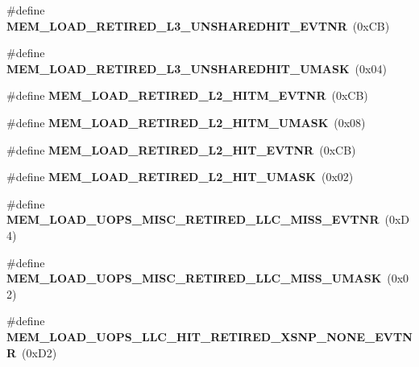 \begin{DoxyCompactItemize}
\item 
\#define {\bfseries M\+E\+M\+\_\+\+L\+O\+A\+D\+\_\+\+R\+E\+T\+I\+R\+E\+D\+\_\+\+L3\+\_\+\+U\+N\+S\+H\+A\+R\+E\+D\+H\+I\+T\+\_\+\+E\+V\+T\+N\+R}~(0x\+C\+B)\label{types_8h_ac3057c525d05ff1ff3bbc866a6959ef0}

\item 
\#define {\bfseries M\+E\+M\+\_\+\+L\+O\+A\+D\+\_\+\+R\+E\+T\+I\+R\+E\+D\+\_\+\+L3\+\_\+\+U\+N\+S\+H\+A\+R\+E\+D\+H\+I\+T\+\_\+\+U\+M\+A\+S\+K}~(0x04)\label{types_8h_a82af69ba17f2c14d73f672e6ab64392d}

\item 
\#define {\bfseries M\+E\+M\+\_\+\+L\+O\+A\+D\+\_\+\+R\+E\+T\+I\+R\+E\+D\+\_\+\+L2\+\_\+\+H\+I\+T\+M\+\_\+\+E\+V\+T\+N\+R}~(0x\+C\+B)\label{types_8h_a4fa3ebccc930b769a6fab108e11d98a1}

\item 
\#define {\bfseries M\+E\+M\+\_\+\+L\+O\+A\+D\+\_\+\+R\+E\+T\+I\+R\+E\+D\+\_\+\+L2\+\_\+\+H\+I\+T\+M\+\_\+\+U\+M\+A\+S\+K}~(0x08)\label{types_8h_a425b82db02859d2176d1626972950617}

\item 
\#define {\bfseries M\+E\+M\+\_\+\+L\+O\+A\+D\+\_\+\+R\+E\+T\+I\+R\+E\+D\+\_\+\+L2\+\_\+\+H\+I\+T\+\_\+\+E\+V\+T\+N\+R}~(0x\+C\+B)\label{types_8h_ab0383f3dadd106b0e563ad7459a4fc78}

\item 
\#define {\bfseries M\+E\+M\+\_\+\+L\+O\+A\+D\+\_\+\+R\+E\+T\+I\+R\+E\+D\+\_\+\+L2\+\_\+\+H\+I\+T\+\_\+\+U\+M\+A\+S\+K}~(0x02)\label{types_8h_a74427facc02a83299c443b9b6e424cc1}

\item 
\#define {\bfseries M\+E\+M\+\_\+\+L\+O\+A\+D\+\_\+\+U\+O\+P\+S\+\_\+\+M\+I\+S\+C\+\_\+\+R\+E\+T\+I\+R\+E\+D\+\_\+\+L\+L\+C\+\_\+\+M\+I\+S\+S\+\_\+\+E\+V\+T\+N\+R}~(0x\+D4)\label{types_8h_ab964a48398e98cbc7d1a7d08937a5c06}

\item 
\#define {\bfseries M\+E\+M\+\_\+\+L\+O\+A\+D\+\_\+\+U\+O\+P\+S\+\_\+\+M\+I\+S\+C\+\_\+\+R\+E\+T\+I\+R\+E\+D\+\_\+\+L\+L\+C\+\_\+\+M\+I\+S\+S\+\_\+\+U\+M\+A\+S\+K}~(0x02)\label{types_8h_a80c955ec4c26781b4be38c9acda01914}

\item 
\#define {\bfseries M\+E\+M\+\_\+\+L\+O\+A\+D\+\_\+\+U\+O\+P\+S\+\_\+\+L\+L\+C\+\_\+\+H\+I\+T\+\_\+\+R\+E\+T\+I\+R\+E\+D\+\_\+\+X\+S\+N\+P\+\_\+\+N\+O\+N\+E\+\_\+\+E\+V\+T\+N\+R}~(0x\+D2)\label{types_8h_a9cd79f19e709d1fe6974ceb31f00eaec}


\end{DoxyCompactItemize}
